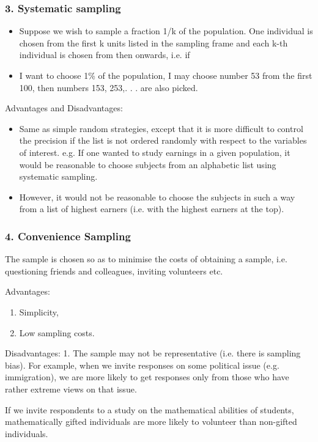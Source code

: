 \subsubsection{3. Systematic sampling}
\begin{itemize}
\item Suppose we wish to sample a fraction 1/k of the population. One
individual is chosen from the first k units listed in the sampling
frame and each k-th individual is chosen from then onwards, i.e. if
\item I want to choose 1\% of the population, I may choose number 53
from the first 100, then numbers 153, 253,. . . are also picked.
\end{itemize}
Advantages and Disadvantages: 
\begin{itemize}
\item Same as simple random
strategies, except that it is more difficult to control the precision if
the list is not ordered randomly with respect to the variables of
interest.
e.g. If one wanted to study earnings in a given population, it would
be reasonable to choose subjects from an alphabetic list using
systematic sampling.
\item However, it would not be reasonable to choose the subjects in such
a way from a list of highest earners (i.e. with the highest earners
at the top).
\end{itemize}
\subsubsection{4. Convenience Sampling}
The sample is chosen so as to minimise the costs of obtaining a
sample, i.e. questioning friends and colleagues, inviting volunteers
etc.

Advantages: 
\begin{enumerate}
\item Simplicity, 
\item Low sampling costs.
\end{enumerate}
Disadvantages: 1. The sample may not be representative (i.e.
there is sampling bias). For example, when we invite responses on
some political issue (e.g. immigration), we are more likely to get
responses only from those who have rather extreme views on that
issue. 

If we invite respondents to a study on the mathematical
abilities of students, mathematically gifted individuals are more
likely to volunteer than non-gifted individuals.

